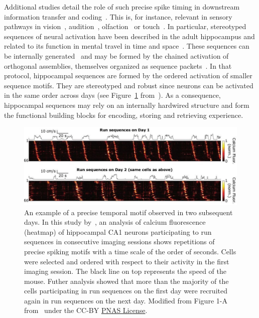 \documentclass[brainsci, %
               review,accept,pdftex,moreauthors
               ]{Definitions/mdpi}
\begin{document}
Additional studies detail the role of such precise spike timing in downstream information transfer and coding~\citep{villette_internally_2015,branco_dendritic_2010,luczak_packet-based_2015}. This is, for instance, relevant in sensory pathways in vision~\citep{meister_concerted_1995}, audition~\citep{decharms_primary_1996}, olfaction~\citep{cleland_construction_2014, kashiwadani_synchronized_1999, rinberg_speed-accuracy_2006} or touch~\citep{johansson_first_2004}.  In particular, stereotyped sequences of neural activation have been described in the adult hippocampus and related to its function in mental travel in time and space~\citep{buzsaki_space_2018}. These sequences can be internally generated~\citep{pastalkova_internally_2008,villette_internally_2015} and may be formed by the chained activation of orthogonal assemblies, themselves organized as sequence packets~\citep{malvache_awake_2016}. In that protocol, hippocampal sequences are formed by the ordered activation of smaller sequence motifs. They are stereotyped and robust since neurons can be activated in the same order across days (see Figure~\ref{fig:haimerl} from~\citep{haimerl_internal_2019}). As a consequence, hippocampal sequences may rely on an internally hardwired structure and form the functional building blocks for encoding, storing and retrieving experience.
%
\begin{figure}[H]
\includegraphics[width=0.98\linewidth]{figures/haimerl2019.jpg}
\caption{
        An example of a precise temporal motif observed in two subsequent days. 
        In this study by~\citep{haimerl_internal_2019}, an analysis of calcium fluorescence (heatmap) of hippocampal CA1 neurons participating to run sequences in consecutive imaging sessions shows repetitions of precise spiking motifs with a time scale of the order of seconds. Cells were selected and ordered with respect to their activity in the first imaging session. The black line on top represents the speed of the mouse. Futher analysis showed that more than the majority of the cells participating in run sequences on the first day were recruited again in run sequences on the next day. Modified from Figure 1-A from~\citep{haimerl_internal_2019} under the CC-BY \href{https://www.pnas.org/doi/full/10.1073/pnas.1718518116}{PNAS License}.}\label{fig:haimerl}  %

\end{figure}
\end{document}
